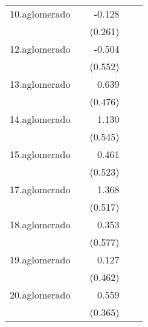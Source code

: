 {\begin{longtable}{l*{4}{D{.}{.}{-1}}}
\addlinespace
10.aglomerado&                     &      -0.128         &                     &                     \\
            &                     &     (0.261)         &                     &                     \\
\addlinespace
12.aglomerado&                     &      -0.504         &                     &                     \\
            &                     &     (0.552)         &                     &                     \\
\addlinespace
13.aglomerado&                     &       0.639         &                     &                     \\
            &                     &     (0.476)         &                     &                     \\
\addlinespace
14.aglomerado&                     &       1.130\sym{*}  &                     &                     \\
            &                     &     (0.545)         &                     &                     \\
\addlinespace
15.aglomerado&                     &       0.461         &                     &                     \\
            &                     &     (0.523)         &                     &                     \\
\addlinespace
17.aglomerado&                     &       1.368\sym{**} &                     &                     \\
            &                     &     (0.517)         &                     &                     \\
\addlinespace
18.aglomerado&                     &       0.353         &                     &                     \\
            &                     &     (0.577)         &                     &                     \\
\addlinespace
19.aglomerado&                     &       0.127         &                     &                     \\
            &                     &     (0.462)         &                     &                     \\
\addlinespace
20.aglomerado&                     &       0.559         &                     &                     \\
            &                     &     (0.365)         &                     &                     \\

\end{longtable}}
